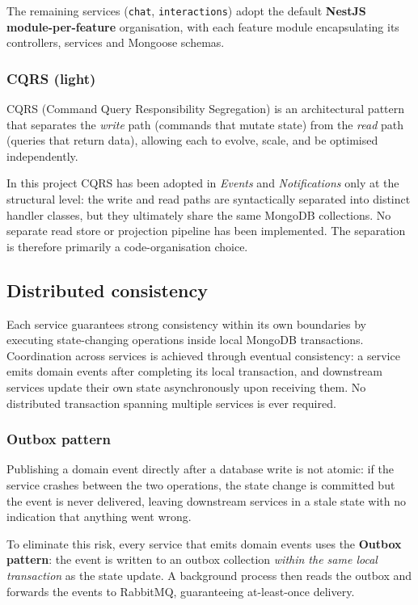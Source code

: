 The remaining services (\texttt{chat}, \texttt{interactions}) adopt the default \textbf{NestJS module-per-feature} organisation, with each feature module encapsulating its controllers, services and Mongoose schemas.

\subsubsection{CQRS (light)}

CQRS (Command Query Responsibility Segregation) is an architectural pattern that separates the \textit{write} path (commands that mutate state) from the \textit{read} path (queries that return data), allowing each to evolve, scale, and be optimised independently.

In this project CQRS has been adopted in \textit{Events} and \textit{Notifications} only at the structural level: the write and read paths are syntactically separated into distinct handler classes, but they ultimately share the same MongoDB collections. No separate read store or projection pipeline has been implemented. The separation is therefore primarily a code-organisation choice.

\subsection{Distributed consistency}

Each service guarantees strong consistency within its own boundaries by executing state-changing operations inside local MongoDB transactions. Coordination across services is achieved through eventual consistency: a service emits domain events after completing its local transaction, and downstream services update their own state asynchronously upon receiving them. No distributed transaction spanning multiple services is ever required.

\subsubsection{Outbox pattern}

Publishing a domain event directly after a database write is not atomic: if the service crashes between the two operations, the state change is committed but the event is never delivered, leaving downstream services in a stale state with no indication that anything went wrong.

To eliminate this risk, every service that emits domain events uses the \textbf{Outbox pattern}: the event is written to an outbox collection \textit{within the same local transaction} as the state update. A background process then reads the outbox and forwards the events to RabbitMQ, guaranteeing at-least-once delivery.

